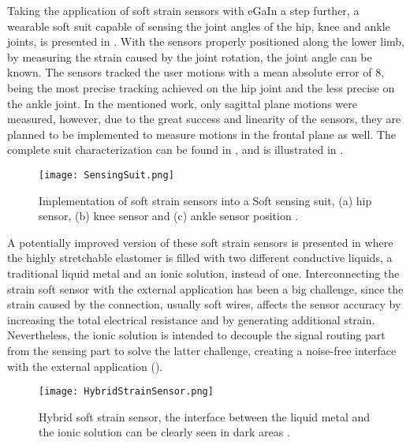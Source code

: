 Taking the application of soft strain sensors with eGaIn a step further, a wearable soft suit capable of sensing the joint angles of the hip, knee and ankle joints, is presented in \cite{mengucc2013soft}. With the sensors properly positioned along the lower limb, by measuring the strain caused by the joint rotation, the joint angle can be known. The sensors tracked the user motions with a mean absolute error of 8\textdegree{}, being the most precise tracking achieved on the hip joint and the less precise on the ankle joint. In the mentioned work, only sagittal plane motions were measured, however, due to the great success and linearity of the sensors, they are planned to be implemented to measure motions in the frontal plane as well. The complete suit characterization can be found in \cite{mengucc2014wearable}, and is illustrated in .

\begin{figure}[hbtp!]
    \centering
    \texttt{[image: SensingSuit.png]}
    \caption[Implementation of soft strain sensors into a Soft sensing suit, (a) hip sensor, (b) knee sensor and (c) ankle sensor position.]{Implementation of soft strain sensors into a Soft sensing suit, (a) hip sensor, (b) knee sensor and (c) ankle sensor position \cite{mengucc2013soft}. }
    \label{fig:Sensing_suit}
\end{figure}

A potentially improved version of these soft strain sensors is presented in \cite{Chossat2013} where the highly stretchable elastomer is filled with two different conductive liquids, a traditional liquid metal and an ionic solution, instead of one. Interconnecting the strain soft sensor with the external application has been a big challenge, since the strain caused by the connection, usually soft wires, affects the sensor accuracy by increasing the total electrical resistance and by generating additional strain. Nevertheless, the ionic solution is intended to decouple the signal routing part from the sensing part to solve the latter challenge, creating a noise-free interface with the external application ().

\begin{figure}[hbtp!]
    \centering
    \texttt{[image: HybridStrainSensor.png]}
    \caption[Hybrid soft strain sensor, the interface between the liquid metal and the ionic solution can be clearly seen in dark areas.]{Hybrid soft strain sensor, the interface between the liquid metal and the ionic solution can be clearly seen in dark areas \cite{Chossat2013}. }
    \label{fig:hybrid_strain_sensor}
\end{figure}

